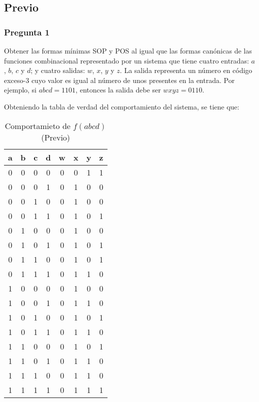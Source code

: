 \documentclass[../procedimientos.tex]{subfiles}
\begin{document}
\subsection{Previo} \label{subs:previo}
\subsubsection*{Pregunta 1}
\begin{em}
  Obtener las formas mínimas SOP y POS al igual que las formas canónicas de 
  las funciones combinacional representado por un sistema que tiene cuatro 
  entradas: $a$, $b$, $c$ y $d$; y cuatro salidas: $w$, $x$, $y$ y $z$. La 
  salida representa un número en código exceso-3 cuyo valor es igual al número 
  de unos presentes en la entrada. Por ejemplo, si $abcd = 1101$, entonces la 
  salida debe ser $wxyz = 0110$.
\end{em}

Obteniendo la tabla de verdad del comportamiento del sistema, se tiene que:
\begin{table}[H]
  \centering
  \begin{tabular}{cccc|cccc}
    \hline
    \textbf{a} & \textbf{b} & \textbf{c} & \textbf{d} & \textbf{w} & 
    \textbf{x} & \textbf{y} & \textbf{z}\\
    \hline
    0	& 0	& 0	& 0	& 0	& 0	& 1	& 1\\
    0	& 0	& 0	& 1	& 0	& 1	& 0	& 0\\
    0	& 0	& 1	& 0	& 0	& 1	& 0	& 0\\
    0	& 0	& 1	& 1	& 0	& 1	& 0	& 1\\
    0	& 1	& 0	& 0	& 0	& 1	& 0	& 0\\
    0	& 1	& 0	& 1	& 0	& 1	& 0	& 1\\
    0	& 1	& 1	& 0	& 0	& 1	& 0	& 1\\
    0	& 1	& 1	& 1	& 0	& 1	& 1	& 0\\
    1	& 0	& 0	& 0	& 0	& 1	& 0	& 0\\
    1	& 0	& 0	& 1	& 0	& 1	& 1	& 0\\
    1	& 0	& 1	& 0	& 0	& 1	& 0	& 1\\
    1	& 0	& 1	& 1	& 0	& 1	& 1	& 0\\
    1	& 1	& 0	& 0	& 0	& 1	& 0	& 1\\
    1	& 1	& 0	& 1	& 0	& 1	& 1	& 0\\
    1	& 1	& 1	& 0	& 0	& 1	& 1	& 0\\
    1	& 1	& 1	& 1	& 0	& 1	& 1	& 1\\
    \hline
  \end{tabular}
  \caption{Comportamieto de $f(abcd)$ (Previo)}
  \label{tab:previo_1}
\end{table}
\end{document}
